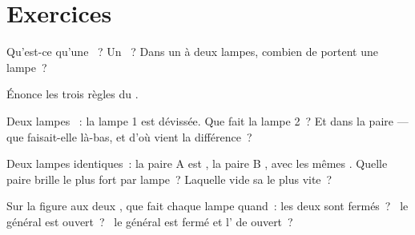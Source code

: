 \section{Exercices}

\begin{exercise}[$\star$]\label{exo:g5:series-parallel-circuits:1}
Qu'est-ce qu'une ~? Un ~? Dans un  à
deux lampes, combien de  portent une lampe~?
\end{exercise}

\begin{exercise}[$\star$]\label{exo:g5:series-parallel-circuits:2}
Énonce les trois règles du .
\end{exercise}

\begin{exercise}[$\star$]\label{exo:g5:series-parallel-circuits:3}
Deux lampes ~: la lampe 1 est dévissée. Que fait la
lampe 2~? Et dans la paire  --- que faisait-elle là-bas, et
d'où vient la différence~?
\end{exercise}

\begin{exercise}[$\star$]\label{exo:g5:series-parallel-circuits:4}
Deux lampes identiques~: la paire A est , la paire B , avec les mêmes . Quelle paire brille le plus fort
par lampe~? Laquelle vide sa  le plus vite~?
\end{exercise}

\begin{exercise}[$\star$]\label{exo:g5:series-parallel-circuits:5}
Sur la figure aux deux , que fait chaque lampe quand~:
les deux  sont fermés~? \ le général est ouvert~? \ le
général est fermé et l' de  ouvert~?
\end{exercise}

